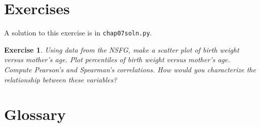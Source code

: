 \documentclass[12pt]{book}
\theoremstyle{exercise}
\newtheorem{exercise}{Exercise}[chapter]
\begin{document}
\section{Exercises}

A solution to this exercise is in \verb"chap07soln.py".

\begin{exercise}
Using data from the NSFG, make a scatter plot of birth weight
versus mother's age.  Plot percentiles of birth weight
versus mother's age.  Compute Pearson's and Spearman's correlations.
How would you characterize the relationship
between these variables?%
%
%
%
\end{exercise}


\section{Glossary}
\end{document}
